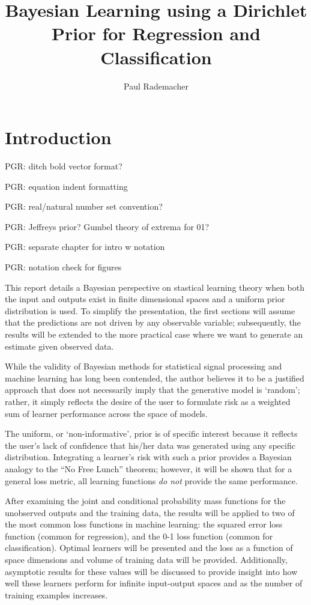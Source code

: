 \documentclass[12pt]{report}
\title{Bayesian Learning using a Dirichlet Prior for Regression and Classification}
\author{Paul Rademacher}
\begin{document}
\maketitle
\tableofcontents

\chapter{Introduction}

PGR: ditch bold vector format?

PGR: equation indent formatting

PGR: real/natural number set convention?

PGR: Jeffreys prior? Gumbel theory of extrema for 01?

PGR: separate chapter for intro w notation

PGR: notation check for figures



This report details a Bayesian perspective on stastical learning theory when both the input and outputs exist in finite dimensional spaces and a uniform prior distribution is used. To simplify the presentation, the first sections will assume that the predictions are not driven by any observable variable; subsequently, the results will be extended to the more practical case where we want to generate an estimate given observed data.

While the validity of Bayesian methods for statistical signal processing and machine learning has long been contended, the author believes it to be a justified approach that does not necessarily imply that the generative model is `random'; rather, it simply reflects the desire of the user to formulate risk as a weighted sum of learner performance across the space of models. 

The uniform, or `non-informative', prior is of specific interest because it reflects the user's lack of confidence that his/her data was generated using any specific distribution. Integrating a learner's risk with such a prior provides a Bayesian analogy to the ``No Free Lunch'' theorem; however, it will be shown that for a general loss metric, all learning functions \emph{do not} provide the same performance.

After examining the joint and conditional probability mass functions for the unobserved outputs and the training data, the results will be applied to two of the most common loss functions in machine learning: the squared error loss function (common for regression), and the 0-1 loss function (common for classification). Optimal learners will be presented and the loss as a function of space dimensions and volume of training data will be provided. Additionally, asymptotic results for these values will be discussed to provide insight into how well these learners perform for infinite input-output spaces and as the number of training examples increases. 
\end{document}

